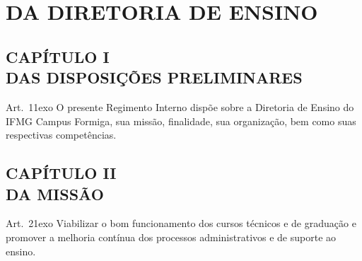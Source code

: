 \documentclass[a4paper,12pt]{report}
\newcommand{\ORD}[2]{#1\raise1ex\hbox{\scriptsize#2}}
\begin{document}
\tableofcontents

\renewcommand*{\chaptername}{TÍTULO}
\chapter{DA DIRETORIA DE ENSINO}
\setcounter{page}{1}


\section{CAPÍTULO I \\ DAS DISPOSIÇÕES PRELIMINARES}

Art.~\ORD{1}{o} O presente Regimento Interno dispõe sobre a Diretoria de Ensino do IFMG 
Campus Formiga, sua missão, finalidade, sua organização, bem como suas respectivas 
competências.


\section{CAPÍTULO II \\ DA MISSÃO}

Art.~\ORD{2}{o} Viabilizar o bom funcionamento dos cursos técnicos e de graduação e 
promover a melhoria contínua dos processos administrativos e de suporte ao ensino.

\end{document}
